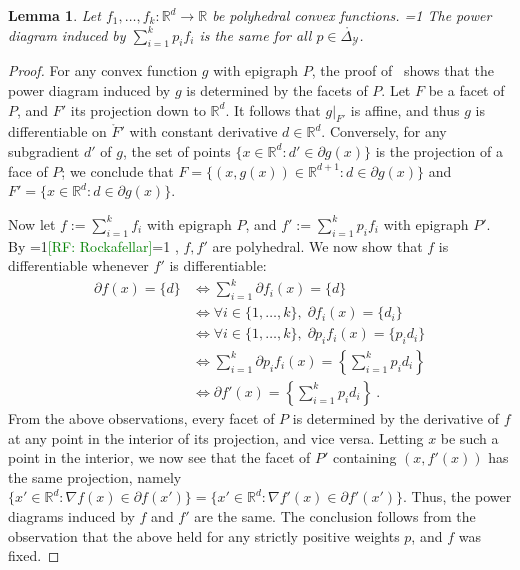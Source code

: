 \documentclass[12pt]{article}
\newcommand{\Comments}{1}
\newcommand{\mynote}[2]{\ifnum\Comments=1\textcolor{#1}{#2}\fi}
\newcommand{\mytodo}[2]{\ifnum\Comments=1%
  \todo[linecolor=#1!80!black,backgroundcolor=#1,bordercolor=#1!80!black]{#2}\fi}
\newcommand{\raf}[1]{\mynote{green}{[RF: #1]}}
\newcommand{\jessiet}[1]{\mytodo{purple!20!white}{JF: #1}}
\newcommand{\reals}{\mathbb{R}}
\newcommand{\simplex}{\Delta_\Y}
\newcommand{\Y}{\mathcal{Y}}
\newcommand{\inter}[1]{\mathring{#1}}%
\newtheorem{lemma}{Lemma}
\begin{document}
\begin{lemma}\label{lem:polyhedral-pd-same}
  Let $f_1,\ldots,f_k:\reals^d\to\reals$ be polyhedral convex functions.
  \jessiet{Replace $k$ with $m$?}
  The power diagram induced by $\sum_{i=1}^k p_i f_i$ is the same for all $p \in \inter\simplex$.
\end{lemma}
\begin{proof}
  For any convex function $g$ with epigraph $P$, the proof of~\citet[Theorem 4]{aurenhammer1987power} shows that the power diagram induced by $g$ is determined by the facets of $P$.
  Let $F$ be a facet of $P$, and $F'$ its projection down to $\reals^d$.
  It follows that $g|_{F'}$ is affine, and thus $g$ is differentiable on $\inter F'$ with constant derivative $d\in\reals^d$.
  Conversely, for any subgradient $d'$ of $g$, the set of points $\{x\in\reals^d : d'\in\partial g(x)\}$ is the projection of a face of $P$; we conclude that $F = \{(x,g(x))\in\reals^{d+1} : d\in\partial g(x)\}$ and $F' = \{x\in\reals^d : d\in\partial g(x)\}$.

  Now let $f := \sum_{i=1}^k f_i$ with epigraph $P$, and $f' := \sum_{i=1}^k p_i f_i$ with epigraph $P'$.
  By \raf{Rockafellar}\jessiet{\cite{rockafellar1997convex}}, $f,f'$ are polyhedral.
  We now show that $f$ is differentiable whenever $f'$ is differentiable:
  \begin{align*}
    \partial f(x) = \{d\}
    &\iff \sum_{i=1}^k \partial f_i(x) = \{d\} \\
    &\iff \forall i\in\{1,\ldots,k\}, \; \partial f_i(x) = \{d_i\} \\
    &\iff \forall i\in\{1,\ldots,k\}, \; \partial p_i f_i(x) = \{p_id_i\} \\
    &\iff \sum_{i=1}^k \partial p_if_i(x) = \left\{\sum_{i=1}^k p_id_i\right\} \\
    &\iff \partial f'(x) = \left\{\sum_{i=1}^k p_id_i\right\}~.
  \end{align*}
  From the above observations, every facet of $P$ is determined by the derivative of $f$ at any point in the interior of its projection, and vice versa.
  Letting $x$ be such a point in the interior, we now see that the facet of $P'$ containing $(x,f'(x))$ has the same projection, namely $\{x'\in\reals^d : \nabla f(x) \in \partial f(x')\} = \{x'\in\reals^d : \nabla f'(x) \in \partial f'(x')\}$.
  Thus, the power diagrams induced by $f$ and $f'$ are the same.
  The conclusion follows from the observation that the above held for any strictly positive weights $p$, and $f$ was fixed.
\end{proof}
\end{document}
